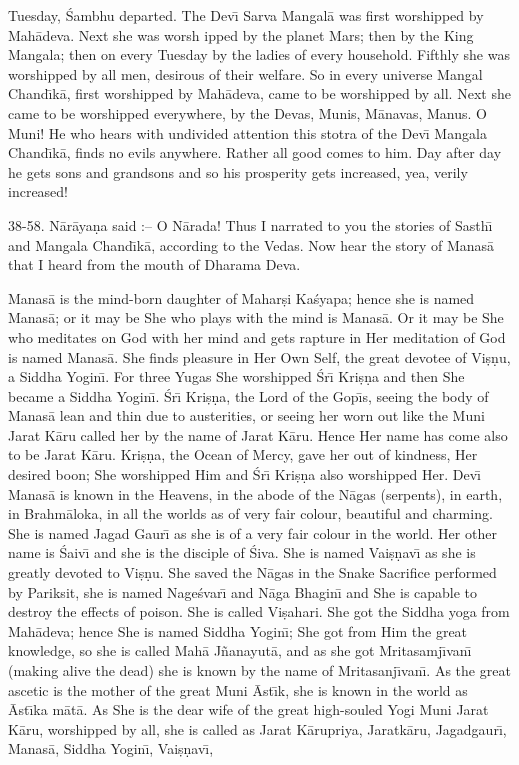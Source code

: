 Tuesday, \'Sambhu departed. The Dev\={\i} Sarva Mangal\=a was first worshipped by Mah\=adeva. Next she was worsh ipped by the planet Mars; then by the King Mangala; then on every Tuesday by the ladies of every household. Fifthly she was worshipped by all men, desirous of their welfare. So in every universe Mangal Chand\={\i}k\=a, first worshipped by Mah\=adeva, came to be worshipped by all. Next she came to be worshipped everywhere, by the Devas, Munis, M\=anavas, Manus. O Muni! He who hears with undivided attention this stotra of the Dev\={\i} Mangala Chand\={\i}k\=a, finds no evils anywhere. Rather all good comes to him. Day after day he gets sons and grandsons and so his prosperity gets increased, yea, verily increased!

38-58. N\=ar\=aya\d{n}a said :-- O N\=arada! Thus I narrated to you the stories of Sasth\={\i} and Mangala Chand\={\i}k\=a, according to the Vedas. Now hear the story of Manas\=a that I heard from the mouth of Dharama Deva.

Manas\=a is the mind-born daughter of Mahar\d{s}i Ka\'syapa; hence she is named Manas\=a; or it may be She who plays with the mind is Manas\=a. Or it may be She who meditates on God with her mind and gets rapture in Her meditation of God is named Manas\=a. She finds pleasure in Her Own Self, the great devotee of Vi\d{s}\d{n}u, a Siddha Yogin\={\i}. For three Yugas She worshipped \'Sr\={\i} Kri\d{s}\d{n}a and then She became a Siddha Yogin\={\i}. \'Sr\={\i} Kri\d{s}\d{n}a, the Lord of the Gop\={\i}s, seeing the body of Manas\=a lean and thin due to austerities, or seeing her worn out like the Muni Jarat K\=aru called her by the name of Jarat K\=aru. Hence Her name has come also to be Jarat K\=aru. Kri\d{s}\d{n}a, the Ocean of Mercy, gave her out of kindness, Her desired boon; She worshipped Him and \'Sr\={\i} Kri\d{s}\d{n}a also worshipped Her. Dev\={\i} Manas\=a is known in the Heavens, in the abode of the N\=agas (serpents), in earth, in Brahm\=aloka, in all the worlds as of very fair colour, beautiful and charming. She is named Jagad Gaur\={\i} as she is of a very fair colour in the world. Her other name is \'Saiv\={\i} and she is the disciple of \'Siva. She is named Vai\d{s}\d{n}av\={\i} as she is greatly devoted to Vi\d{s}\d{n}u. She saved the N\=agas in the Snake Sacrifice performed by Pariksit, she is named Nage\'svar\={\i} and N\=aga Bhagin\={\i} and She is capable to destroy the effects of poison. She is called Vi\d{s}ahari. She got the Siddha yoga from Mah\=adeva; hence She is named Siddha Yogin\={\i}; She got from Him the great knowledge, so she is called Mah\=a J\~nanayut\=a, and as she got Mritasamj\={\i}van\={\i} (making alive the dead) she is known by the name of Mritasanj\={\i}van\={\i}. As the great ascetic is the mother of the great Muni \=Ast\={\i}k, she is known in the world as \=Ast\={\i}ka m\=at\=a. As She is the dear wife of the great high-souled Yogi Muni Jarat K\=aru, worshipped by all, she is called as Jarat
K\=arupriya, Jaratk\=aru, Jagadgaur\={\i}, Manas\=a, Siddha Yogin\={\i}, Vai\d{s}\d{n}av\={\i},

